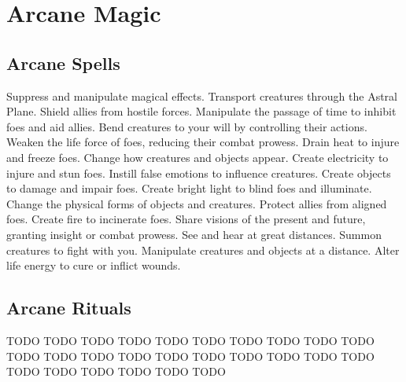 \small
\section{Arcane Magic}\label{Arcane Magic}
\subsection{Arcane Spells}\label{Arcane Spells}
\begin{spelllist}
 Suppress and manipulate magical effects.
 Transport creatures through the Astral Plane.
 Shield allies from hostile forces.
 Manipulate the passage of time to inhibit foes and aid allies.
 Bend creatures to your will by controlling their actions.
 Weaken the life force of foes, reducing their combat prowess.
 Drain heat to injure and freeze foes.
 Change how creatures and objects appear.
 Create electricity to injure and stun foes.
 Instill false emotions to influence creatures.
 Create objects to damage and impair foes.
 Create bright light to blind foes and illuminate.
 Change the physical forms of objects and creatures.
 Protect allies from aligned foes.
 Create fire to incinerate foes.
 Share visions of the present and future, granting insight or combat prowess.
 See and hear at great distances.
 Summon creatures to fight with you.
 Manipulate creatures and objects at a distance.
 Alter life energy to cure or inflict wounds.
\end{spelllist}
\subsection{Arcane Rituals}\label{Arcane Rituals}
\begin{spelllist}
 TODO
 TODO
 TODO
 TODO
 TODO
 TODO
 TODO
 TODO
 TODO
 TODO
 TODO
 TODO
 TODO
 TODO
 TODO
 TODO
 TODO
 TODO
 TODO
 TODO
 TODO
 TODO
 TODO
 TODO
 TODO
 TODO
\end{spelllist}
\small
